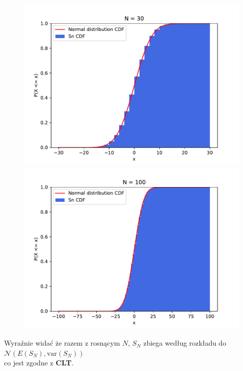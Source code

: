 \documentclass{article}
\begin{document}
\begin{figure}[h!]
    \begin{minipage}{0.45\textwidth}
        \centering
        \includegraphics[scale=0.5]{./plots/exc2/n30.pdf}
    \end{minipage}%
    \begin{minipage}{0.45\textwidth}
        \centering
        \includegraphics[scale=0.5]{./plots/exc2/n100.pdf}
    \end{minipage}
\end{figure}

Wyraźnie widać że razem z rosnącym \( N \), \( S_N \) zbiega według rozkładu do \( \mathcal{N}\left(E\left(S_N\right), \text{var}\left(S_N\right)\right) \)\\
co jest zgodne z \textbf{CLT}. \\
\end{document}
